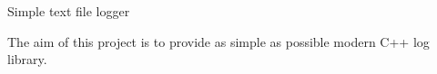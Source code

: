 Simple text file logger

The aim of this project is to provide as simple as possible modern C++ log library. 